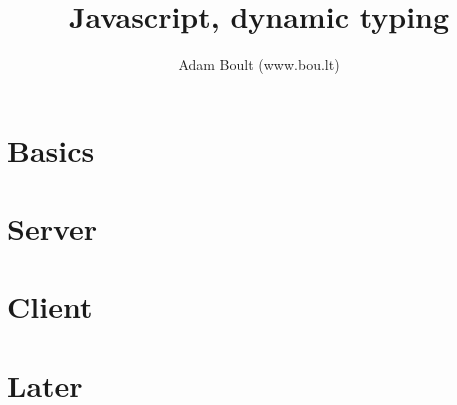 \documentclass[oneside]{book}
\begin{document}
\author{Adam Boult (www.bou.lt)}
\title{Javascript, dynamic typing}
\maketitle

\setcounter{tocdepth}{0}
\tableofcontents



\part{Basics}







\part{Server}







\part{Client}




\part{Later}


\end{document}
